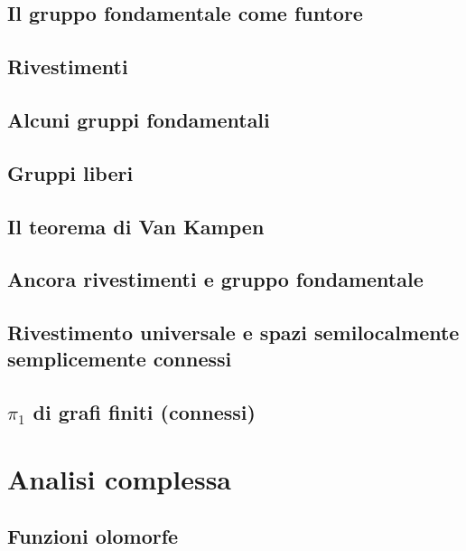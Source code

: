 \documentclass{article}
\begin{document}
\subsection{Il gruppo fondamentale come funtore}


\subsection{Rivestimenti}


\subsection{Alcuni gruppi fondamentali}


\subsection{Gruppi liberi}


\subsection{Il teorema di Van Kampen}


\subsection{Ancora rivestimenti e gruppo fondamentale}


\subsection{Rivestimento universale e spazi semilocalmente semplicemente connessi}


\subsection{$\pi_1$ di grafi finiti (connessi)}


\section{Analisi complessa}

\subsection{Funzioni olomorfe}

\end{document}

